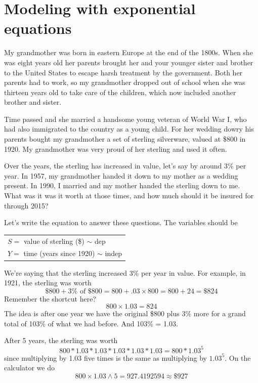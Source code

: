 

\section{Modeling with exponential equations}

My grandmother was born in eastern Europe at the end of the 1800s.  When she was eight years old her parents brought her and your younger sister and brother to the United States to escape harsh treatment by the government.  Both her parents had to work, so my grandmother dropped out of school when she was thirteen years old to take care of the children, which now included another brother and sister. 

Time passed and she married a handsome young veteran of World War I, who had also immigrated to the country as a young child.  
For her wedding dowry his parents bought my grandmother a set of sterling silverware, valued at \$800 in 1920.  My grandmother was very proud of her sterling and used it often.

Over the years, the sterling has increased in value, let's say by around 3\% per year.  In 1957, my grandmother handed it down to my mother as a wedding present.  In 1990, I married and my mother handed the sterling down to me.   What was it was it worth at those times, and how much should it be insured for through 2015?  

Let's write the equation to answer these questions.  The variables should be
\begin{center}
\begin{tabular} {l} 
$S=$ value of sterling (\$) $\sim$ dep \\ 
$Y =$ time (years since 1920) $\sim$ indep \\
\end{tabular}
\end{center}

We're saying that the sterling increased 3\% per year in value.  For example, in 1921, the sterling was worth
$$\$800 + 3\% \text{ of } \$800 = 800 + .03 \times 800 = 800 + 24= \$824$$
Remember the shortcut here? 
$$800 \times 1.03 = 824$$
The idea is after one year we have the original \$800 plus 3\% more for a grand total of 103\% of what we had before.  And 103\% = 1.03.  

After 5 years, the sterling was worth
$$800 \ast 1.03 \ast 1.03  \ast 1.03  \ast 1.03  \ast 1.03 = 800 \ast 1.03^5$$ 
since multiplying by 1.03 five times is the same as multiplying by $1.03^5$.
On the calculator we do
$$800 \times 1.03 \wedge 5 = 927.4192594 \approx \$927$$


